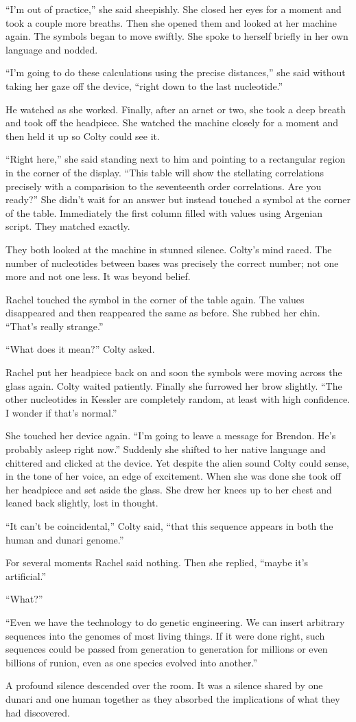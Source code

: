 ``I'm out of practice,'' she said sheepishly. She closed her eyes for a moment and took a couple
more breaths. Then she opened them and looked at her machine again. The symbols began to move
swiftly. She spoke to herself briefly in her own language and nodded.

``I'm going to do these calculations using the precise distances,'' she said without taking her
gaze off the device, ``right down to the last nucleotide.''

He watched as she worked. Finally, after an arnet or two, she took a deep breath and took off
the headpiece. She watched the machine closely for a moment and then held it up so Colty could
see it.

``Right here,'' she said standing next to him and pointing to a rectangular region in the corner
of the display. ``This table will show the stellating correlations precisely with a comparision
to the seventeenth order correlations. Are you ready?'' She didn't wait for an answer but
instead touched a symbol at the corner of the table. Immediately the first column filled with
values using Argenian script. They matched exactly.

They both looked at the machine in stunned silence. Colty's mind raced. The number of
nucleotides between bases was precisely the correct number; not one more and not one less. It
was beyond belief.

Rachel touched the symbol in the corner of the table again. The values disappeared and then
reappeared the same as before. She rubbed her chin. ``That's really strange.''

``What does it mean?'' Colty asked.

Rachel put her headpiece back on and soon the symbols were moving across the glass again. Colty
waited patiently. Finally she furrowed her brow slightly. ``The other nucleotides in Kessler are
completely random, at least with high confidence. I wonder if that's normal.''

She touched her device again. ``I'm going to leave a message for Brendon. He's probably asleep
right now.'' Suddenly she shifted to her native language and chittered and clicked at the
device. Yet despite the alien sound Colty could sense, in the tone of her voice, an edge of
excitement. When she was done she took off her headpiece and set aside the glass. She drew her
knees up to her chest and leaned back slightly, lost in thought.

``It can't be coincidental,'' Colty said, ``that this sequence appears in both the human and
dunari genome.''

For several moments Rachel said nothing. Then she replied, ``maybe it's artificial.''

``What?''

``Even we have the technology to do genetic engineering. We can insert arbitrary sequences into
the genomes of most living things. If it were done right, such sequences could be passed from
generation to generation for millions or even billions of runion, even as one species evolved
into another.''

A profound silence descended over the room. It was a silence shared by one dunari and one human
together as they absorbed the implications of what they had discovered.
